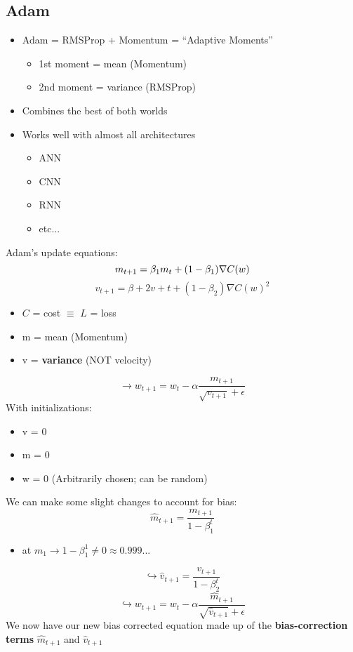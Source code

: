 \subsection{Adam}
\begin{itemize}
    \item Adam = RMSProp + Momentum = ``Adaptive Moments''
    \begin{itemize}
        \item 1st moment = mean (Momentum)
        \item 2nd moment = variance (RMSProp)
    \end{itemize}
    \item Combines the best of both worlds
    \item Works well with almost all architectures
    \begin{itemize}
        \item ANN
        \item CNN
        \item RNN
        \item etc...
    \end{itemize}
\end{itemize}

Adam's update equations:
\[
m_{t+1} = \beta_1 m_t + (1-\beta_1)\nabla C(w) \\
\]
\[
v_{t+1} = \beta+2 v+t + (1-\beta_2) \nabla C(w)^2
\]
\begin{itemize}
    \item $C$ = cost $\equiv$ $L$ = loss
    \item m = mean (Momentum)
    \item v = \textbf{variance} (NOT velocity)
\end{itemize}
\[\longrightarrow
w_{t+1} = w_t - \alpha \frac{m_{t+1}}{\sqrt{v_{t+1}}+\epsilon}
\]
With initializations:
\begin{itemize}
    \item v = 0
    \item m = 0
    \item w = 0 (Arbitrarily chosen; can be random)
\end{itemize}
We can make some slight changes to account for bias:
\[
\hat{m}_{t+1} = \frac{m_{t+1}}{1-\beta_1^t}
\]
\begin{itemize}
    \item at $m_1 \rightarrow 1-\beta_1^1 \neq 0 \approx 0.999...$
\end{itemize}
\[
\hookrightarrow
\hat{v}_{t+1} = \frac{v_{t+1}}{1-\beta_2^t}
\]
\[
\hookrightarrow \boxed{
w_{t+1} = w_t - \alpha \frac{\hat{m}_{t+1}}{\sqrt{\hat{v}_{t+1}}+\epsilon}}
\]
We now have our new bias corrected equation made up of the \textbf{bias-correction terms} $\hat{m}_{t+1}$ and $\hat{v}_{t+1}$
